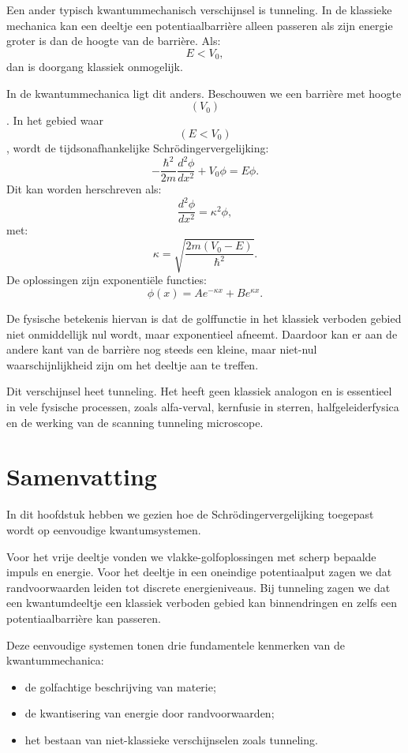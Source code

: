 \documentclass{report} %
\begin{document}
    Een ander typisch kwantummechanisch verschijnsel is tunneling. In de klassieke mechanica kan een deeltje een potentiaalbarrière alleen passeren als zijn energie groter is dan de hoogte van de barrière. Als:
    \[
        E<V_0,
    \]
    dan is doorgang klassiek onmogelijk.

    In de kwantummechanica ligt dit anders. Beschouwen we een barrière met hoogte \[(V_0)\]. In het gebied waar \[(E<V_0)\], wordt de tijdsonafhankelijke Schrödingervergelijking:
    \[
        -\frac{\hbar^2}{2m}\frac{d^2\phi}{dx^2}+V_0\phi=E\phi.
    \]
    Dit kan worden herschreven als:
    \[
        \frac{d^2\phi}{dx^2}
        =
        \kappa^2\phi,
    \]
    met:
    \[
        \kappa=
        \sqrt{\frac{2m(V_0-E)}{\hbar^2}}.
    \]
    De oplossingen zijn exponentiële functies:
    \[
        \phi(x)=Ae^{-\kappa x}+Be^{\kappa x}.
    \]

    De fysische betekenis hiervan is dat de golffunctie in het klassiek verboden gebied niet onmiddellijk nul wordt, maar exponentieel afneemt. Daardoor kan er aan de andere kant van de barrière nog steeds een kleine, maar niet-nul waarschijnlijkheid zijn om het deeltje aan te treffen.

    Dit verschijnsel heet tunneling. Het heeft geen klassiek analogon en is essentieel in vele fysische processen, zoals alfa-verval, kernfusie in sterren, halfgeleiderfysica en de werking van de scanning tunneling microscope.


    \section{Samenvatting}

    In dit hoofdstuk hebben we gezien hoe de Schrödingervergelijking toegepast wordt op eenvoudige kwantumsystemen.

    Voor het vrije deeltje vonden we vlakke-golfoplossingen met scherp bepaalde impuls en energie. Voor het deeltje in een oneindige potentiaalput zagen we dat randvoorwaarden leiden tot discrete energieniveaus. Bij tunneling zagen we dat een kwantumdeeltje een klassiek verboden gebied kan binnendringen en zelfs een potentiaalbarrière kan passeren.

    Deze eenvoudige systemen tonen drie fundamentele kenmerken van de kwantummechanica:
    \begin{itemize}
        \item de golfachtige beschrijving van materie;
        \item de kwantisering van energie door randvoorwaarden;
        \item het bestaan van niet-klassieke verschijnselen zoals tunneling.
    \end{itemize}
\end{document}
